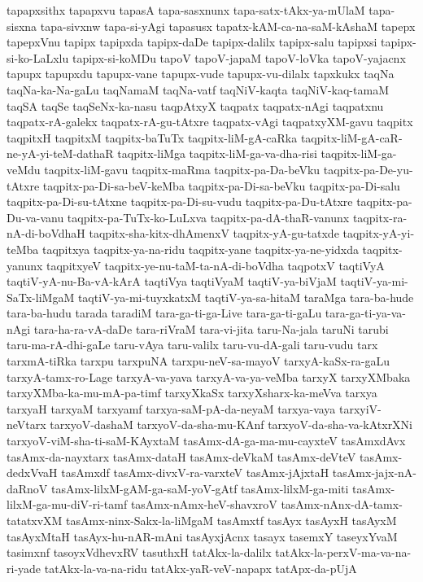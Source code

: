 {tapapxsithx
tapapxvu
tapasA
tapa-sasxnunx
tapa-satx-tAkx-ya-mUlaM
tapa-sisxna
tapa-sivxnw
tapa-si-yAgi
tapasusx
tapatx-kAM-ca-na-saM-kAshaM
tapepx
tapepxVnu
tapipx
tapipxda
tapipx-daDe
tapipx-dalilx
tapipx-salu
tapipxsi
tapipx-si-ko-LaLxlu
tapipx-si-koMDu
tapoV
tapoV-japaM
tapoV-loVka
tapoV-yajacnx
tapupx
tapupxdu
tapupx-vane
tapupx-vude
tapupx-vu-dilalx
tapxkukx
taqNa
taqNa-ka-Na-gaLu
taqNamaM
taqNa-vatf
taqNiV-kaqta
taqNiV-kaq-tamaM
taqSA
taqSe
taqSeNx-ka-nasu
taqpAtxyX
taqpatx
taqpatx-nAgi
taqpatxnu
taqpatx-rA-galekx
taqpatx-rA-gu-tAtxre
taqpatx-vAgi
taqpatxyXM-gavu
taqpitx
taqpitxH
taqpitxM
taqpitx-baTuTx
taqpitx-liM-gA-caRka
taqpitx-liM-gA-caR-ne-yA-yi-teM-dathaR
taqpitx-liMga
taqpitx-liM-ga-va-dha-risi
taqpitx-liM-ga-veMdu
taqpitx-liM-gavu
taqpitx-maRma
taqpitx-pa-Da-beVku
taqpitx-pa-De-yu-tAtxre
taqpitx-pa-Di-sa-beV-keMba
taqpitx-pa-Di-sa-beVku
taqpitx-pa-Di-salu
taqpitx-pa-Di-su-tAtxne
taqpitx-pa-Di-su-vudu
taqpitx-pa-Du-tAtxre
taqpitx-pa-Du-va-vanu
taqpitx-pa-TuTx-ko-LuLxva
taqpitx-pa-dA-thaR-vanunx
taqpitx-ra-nA-di-boVdhaH
taqpitx-sha-kitx-dhAmenxV
taqpitx-yA-gu-tatxde
taqpitx-yA-yi-teMba
taqpitxya
taqpitx-ya-na-ridu
taqpitx-yane
taqpitx-ya-ne-yidxda
taqpitx-yanunx
taqpitxyeV
taqpitx-ye-nu-taM-ta-nA-di-boVdha
taqpotxV
taqtiVyA
taqtiV-yA-nu-Ba-vA-kArA
taqtiVya
taqtiVyaM
taqtiV-ya-biVjaM
taqtiV-ya-mi-SaTx-liMgaM
taqtiV-ya-mi-tuyxkatxM
taqtiV-ya-sa-hitaM
taraMga
tara-ba-hude
tara-ba-hudu
tarada
taradiM
tara-ga-ti-ga-Live
tara-ga-ti-gaLu
tara-ga-ti-ya-va-nAgi
tara-ha-ra-vA-daDe
tara-riVraM
tara-vi-jita
taru-Na-jala
taruNi
tarubi
taru-ma-rA-dhi-gaLe
taru-vAya
taru-valilx
taru-vu-dA-gali
taru-vudu
tarx
tarxmA-tiRka
tarxpu
tarxpuNA
tarxpu-neV-sa-mayoV
tarxyA-kaSx-ra-gaLu
tarxyA-tamx-ro-Lage
tarxyA-va-yava
tarxyA-va-ya-veMba
tarxyX
tarxyXMbaka
tarxyXMba-ka-mu-mA-pa-timf
tarxyXkaSx
tarxyXsharx-ka-meVva
tarxya
tarxyaH
tarxyaM
tarxyamf
tarxya-saM-pA-da-neyaM
tarxya-vaya
tarxyiV-neVtarx
tarxyoV-dashaM
tarxyoV-da-sha-mu-KAnf
tarxyoV-da-sha-va-kAtxrXNi
tarxyoV-viM-sha-ti-saM-KAyxtaM
tasAmx-dA-ga-ma-mu-cayxteV
tasAmxdAvx
tasAmx-da-nayxtarx
tasAmx-dataH
tasAmx-deVkaM
tasAmx-deVteV
tasAmx-dedxVvaH
tasAmxdf
tasAmx-divxV-ra-varxteV
tasAmx-jAjxtaH
tasAmx-jajx-nA-daRnoV
tasAmx-lilxM-gAM-ga-saM-yoV-gAtf
tasAmx-lilxM-ga-miti
tasAmx-lilxM-ga-mu-diV-ri-tamf
tasAmx-nAmx-heV-shavxroV
tasAmx-nAnx-dA-tamx-tatatxvXM
tasAmx-ninx-Sakx-la-liMgaM
tasAmxtf
tasAyx
tasAyxH
tasAyxM
tasAyxMtaH
tasAyx-hu-nAR-mAni
tasAyxjAcnx
tasayx
tasemxY
taseyxYvaM
tasimxnf
tasoyxVdhevxRV
tasuthxH
tatAkx-la-dalilx
tatAkx-la-perxV-ma-va-na-ri-yade
tatAkx-la-va-na-ridu
tatAkx-yaR-veV-napapx
tatApx-da-pUjA
}
